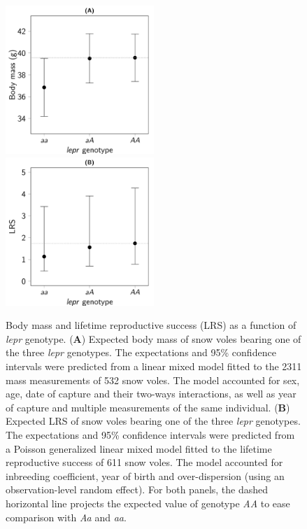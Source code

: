 \begin{figure}[ht]
	\includegraphics[width=0.5\textwidth]{FiguresGeneral/PhenoEffect-1}
	\includegraphics[width=0.5\textwidth]{FiguresGeneral/FitnessEffect-1}
	\caption{Body mass and lifetime reproductive success (LRS) as a function of \emph{lepr} genotype. 
	(\textbf{A}) Expected body mass of snow voles bearing one of the three \emph{lepr} genotypes. The expectations and 95\% confidence intervals were predicted from a linear mixed model fitted to the 2311 mass measurements of 532 snow voles. The model accounted for sex, age, date of capture and their two-ways interactions, as well as year of capture and multiple measurements of the same individual.
	(\textbf{B}) Expected LRS of snow voles bearing one of the three \emph{lepr} genotypes. The expectations and 95\% confidence intervals were predicted from a Poisson generalized linear mixed model fitted to the lifetime reproductive success of 611 snow voles. The model accounted for inbreeding coefficient, year of birth and over-dispersion (using an observation-level random effect). For both panels, the dashed horizontal line projects the expected value of genotype \emph{AA} to ease comparison with \emph{Aa} and \emph{aa}.}
	\label{fig:leprpheno}
\end{figure}

